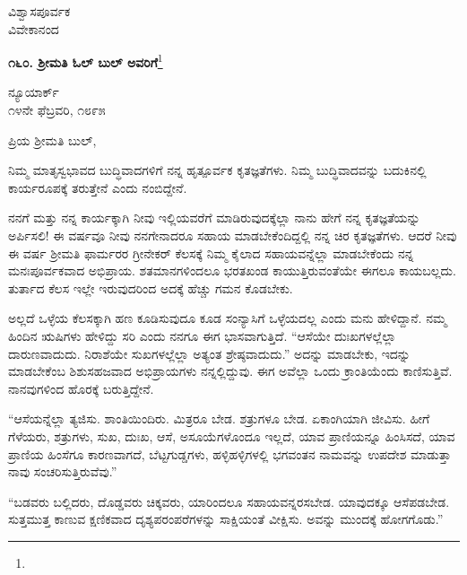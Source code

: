 \vspace{-0.3cm}

{\flushright
ವಿಶ್ವಾಸಪೂರ್ವಕ\\ವಿವೇಕಾನಂದ\par}

\begin{center}
\textbf{೧೬೦. ಶ‍್ರೀಮತಿ ಓಲ್ ಬುಲ್ ಅವರಿಗೆ}\footnote{}
\end{center}

\vspace{-0.6cm}

\begin{flushright}
ನ್ಯೂಯಾರ್ಕ್\\೧೪ನೇ ಫೆಬ್ರವರಿ, ೧೮೯೫
\end{flushright}

\vspace{-0.3cm}

\noindent
ಪ್ರಿಯ ಶ‍್ರೀಮತಿ ಬುಲ್,

ನಿಮ್ಮ ಮಾತೃಸ್ವಭಾವದ ಬುದ್ಧಿವಾದಗಳಿಗೆ ನನ್ನ ಹೃತ್ಪೂರ್ವಕ ಕೃತಜ್ಞತೆಗಳು. ನಿಮ್ಮ ಬುದ್ಧಿವಾದವನ್ನು ಬದುಕಿನಲ್ಲಿ ಕಾರ್ಯರೂಪಕ್ಕೆ ತರುತ್ತೇನೆ ಎಂದು ನಂಬಿದ್ದೇನೆ.

ನನಗೆ ಮತ್ತು ನನ್ನ ಕಾರ್ಯಕ್ಕಾಗಿ ನೀವು ಇಲ್ಲಿಯವರೆಗೆ ಮಾಡಿರುವುದಕ್ಕೆಲ್ಲಾ ನಾನು ಹೇಗೆ ನನ್ನ ಕೃತಜ್ಞತೆಯನ್ನು ಅರ್ಪಿಸಲಿ! ಈ ವರ್ಷವೂ ನೀವು ನನಗೇನಾದರೂ ಸಹಾಯ ಮಾಡಬೇಕೆಂದಿದ್ದಲ್ಲಿ ನನ್ನ ಚಿರ ಕೃತಜ್ಞತೆಗಳು. ಆದರೆ ನೀವು ಈ ವರ್ಷ ಶ‍್ರೀಮತಿ ಫಾರ್ಮರರ ಗ್ರೀನೇಕರ್ ಕೆಲಸಕ್ಕೆ ನಿಮ್ಮ ಕೈಲಾದ ಸಹಾಯವನ್ನೆಲ್ಲಾ ಮಾಡಬೇಕೆಂದು ನನ್ನ ಮನಃಪೂರ್ವಕವಾದ ಅಭಿಪ್ರಾಯ. ಶತಮಾನಗಳಿಂದಲೂ ಭರತಖಂಡ ಕಾಯುತ್ತಿರುವಂತೆಯೇ ಈಗಲೂ ಕಾಯಬಲ್ಲದು. ತುರ್ತಾದ ಕೆಲಸ ಇಲ್ಲೇ ಇರುವುದರಿಂದ ಅದಕ್ಕೆ ಹೆಚ್ಚು ಗಮನ ಕೊಡಬೇಕು.

ಅಲ್ಲದೆ ಒಳ್ಳೆಯ ಕೆಲಸಕ್ಕಾಗಿ ಹಣ ಕೂಡಿಸುವುದೂ ಕೂಡ ಸಂನ್ಯಾಸಿಗೆ ಒಳ್ಳೆಯದಲ್ಲ ಎಂದು ಮನು ಹೇಳಿದ್ದಾನೆ. ನಮ್ಮ ಹಿಂದಿನ ಋಷಿಗಳು ಹೇಳಿದ್ದು ಸರಿ ಎಂದು ನನಗೂ ಈಗ ಭಾಸವಾಗುತ್ತಿದೆ. “ಆಸೆಯೇ ದುಃಖಗಳಲ್ಲೆಲ್ಲಾ ದಾರುಣವಾದುದು. ನಿರಾಶೆಯೇ ಸುಖಗಳಲ್ಲೆಲ್ಲಾ ಅತ್ಯಂತ ಶ್ರೇಷ್ಠವಾದುದು.'' ಅದನ್ನು ಮಾಡಬೇಕು, ಇದನ್ನು ಮಾಡಬೇಕೆಂಬ ಶಿಶುಸಹಜವಾದ ಅಭಿಪ್ರಾಯಗಳು ನನ್ನಲ್ಲಿದ್ದುವು. ಈಗ ಅವೆಲ್ಲಾ ಒಂದು ಕ್ರಾಂತಿಯೆಂದು ಕಾಣಿಸುತ್ತಿವೆ. ನಾನವುಗಳಿಂದ ಹೊರಕ್ಕೆ ಬರುತ್ತಿದ್ದೇನೆ.

“ಆಸೆಯನ್ನೆಲ್ಲಾ ತ್ಯಜಿಸು. ಶಾಂತಿಯಿಂದಿರು. ಮಿತ್ರರೂ ಬೇಡ. ಶತ್ರುಗಳೂ ಬೇಡ. ಏಕಾಂಗಿಯಾಗಿ ಜೀವಿಸು. ಹೀಗೆ ಗೆಳೆಯರು, ಶತ್ರುಗಳು, ಸುಖ, ದುಃಖ, ಆಸೆ, ಅಸೂಯೆಗಳೊಂದೂ ಇಲ್ಲದೆ, ಯಾವ ಪ್ರಾಣಿಯನ್ನೂ ಹಿಂಸಿಸದೆ, ಯಾವ ಪ್ರಾಣಿಯ ಹಿಂಸೆಗೂ ಕಾರಣವಾಗದೆ, ಬೆಟ್ಟಗುಡ್ಡಗಳು, ಹಳ್ಳಿಹಳ್ಳಿಗಳಲ್ಲಿ ಭಗವಂತನ ನಾಮವನ್ನು ಉಪದೇಶ ಮಾಡುತ್ತಾ ನಾವು ಸಂಚರಿಸುತ್ತಿರುವೆವು.”

\vspace{0.1cm}

“ಬಡವರು ಬಲ್ಲಿದರು, ದೊಡ್ಡವರು ಚಿಕ್ಕವರು, ಯಾರಿಂದಲೂ ಸಹಾಯವನ್ನರಸಬೇಡ. ಯಾವುದಕ್ಕೂ ಆಸೆಪಡಬೇಡ. ಸುತ್ತಮುತ್ತ ಕಾಣುವ ಕ್ಷಣಿಕವಾದ ದೃಶ್ಯಪರಂಪರೆಗಳನ್ನು ಸಾಕ್ಷಿಯಂತೆ ವೀಕ್ಷಿಸು. ಅವನ್ನು ಮುಂದಕ್ಕೆ ಹೋಗಗೊಡು.”

